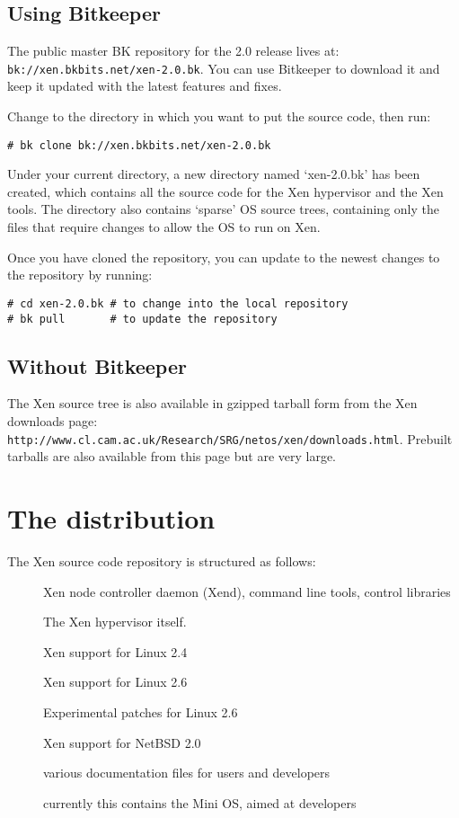 \documentclass[11pt,twoside,final,openright]{xenstyle}
\begin{document}
\subsection{Using Bitkeeper}

The public master BK repository for the 2.0 release lives at: \\
{\tt bk://xen.bkbits.net/xen-2.0.bk}.  You can use Bitkeeper to
download it and keep it updated with the latest features and fixes.

Change to the directory in which you want to put the source code, then
run:
\begin{verbatim}
# bk clone bk://xen.bkbits.net/xen-2.0.bk
\end{verbatim}

Under your current directory, a new directory named `xen-2.0.bk' has
been created, which contains all the source code for the Xen
hypervisor and the Xen tools.  The directory also contains `sparse' OS
source trees, containing only the files that require changes to allow
the OS to run on Xen.

Once you have cloned the repository, you can update to the newest
changes to the repository by running:
\begin{verbatim}
# cd xen-2.0.bk # to change into the local repository
# bk pull       # to update the repository
\end{verbatim}

\subsection{Without Bitkeeper}

The Xen source tree is also available in gzipped tarball form from the
Xen downloads page:\\
{\tt http://www.cl.cam.ac.uk/Research/SRG/netos/xen/downloads.html}.
Prebuilt tarballs are also available from this page but are very large.

\section{The distribution}

The Xen source code repository is structured as follows:

\begin{description}
\item[] Xen node controller daemon (Xend), command line tools, 
  control libraries
\item[] The Xen hypervisor itself.
\item[] Xen support for Linux 2.4
\item[] Xen support for Linux 2.6
\item[] Experimental patches for Linux 2.6
\item[] Xen support for NetBSD 2.0
\item[] various documentation files for users and developers
\item[] currently this contains the Mini OS, aimed at developers
\end{description}
\end{document}
